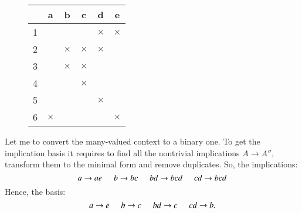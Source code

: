 \documentclass[12pt]{report}
\begin{document}
\begin{solution}
    \begin{wrapfigure}{r}{0.3\columnwidth}
        \begin{flushright}
    \vspace*{-1.5cm}

            \begin{tabular}{c|c|c|c|c|c|}
                & a & b        & c        & d        & e        \\ \hline
              1 &   &          &          & $\times$ & $\times$ \\ \hline
              2 &   & $\times$ & $\times$ & $\times$ &          \\ \hline
              3 &   & $\times$ & $\times$ &          &          \\ \hline
              4 &   &          & $\times$ &          &          \\ \hline
              5 &   &          &          & $\times$ &          \\ \hline
              6 & $\times$ & & & & $\times$ \\ \hline
              \end{tabular}
        \end{flushright}
    \end{wrapfigure}
    
    Let me to convert the many-valued context to a binary one. To get the implication basis it requires to find all the nontrivial implications $A \to A''$, transform them to the minimal form and remove duplicates. So, the implications:
    \[
        a \to ae \hspace*{0.5cm} b\to bc \hspace*{0.5cm} bd \to bcd \hspace*{0.5cm} cd \to bcd  
    \]
    Hence, the basis:
    \[
        a \to e \hspace*{0.5cm} b \to c \hspace*{0.5cm} bd \to c \hspace*{0.5cm} cd \to b.  
    \]
\end{solution}
\end{document}
